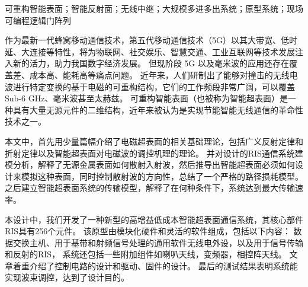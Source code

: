 \documentclass[supercite]{HustGraduPaper}
\begin{document}
\begin{cnabstract}{可重构智能表面；智能反射面；无线中继；大规模多进多出系统；原型系统；现场可编程逻辑门阵列}

	作为最新一代蜂窝移动通信技术，第五代移动通信技术（5G）以其大带宽、低时延、大连接等特性，将为物联网、社交娱乐、智慧交通、工业互联网等技术发展注入新的活力，助力我国数字经济发展。
	但现阶段 5G 以及毫米波的应用还存在覆盖差、成本高、能耗高等痛点问题。
	近年来，人们研制出了能够对撞击的无线电波进行特定变换的基于电磁的可重构结构，它们的工作频段非常广阔，可以覆盖 Sub-­6 GHz、毫米波甚至太赫兹。
	可重构智能表面（也被称为智能超表面）是一种具有大量无源元件的二维结构，近年来被认为是实现节能智能无线通信的革命性技术之一。

	本文中，首先用少量篇幅介绍了电磁超表面的相关基础理论，包括广义反射定律和折射定律以及智能超表面对电磁波的调控机理的理论。
	并对设计的RIS通信系统建模分析，解释了无源金属表面如何散射入射波，然后推导出智能超表面必须如何设计来模拟这种表面，同时控制散射波的方向性，总结了一个严格的路径损耗模型。
	之后建立智能超表面系统的传输模型，解释了在何种条件下，系统达到最大传输速率。
	
	本设计中，我们开发了一种新型的高增益低成本智能超表面通信系统，其核心部件RIS具有256个元件。
	该原型由模块化硬件和灵活的软件组成，包括以下内容：
	数据交换主机、用于基带和射频信号处理的通用软件无线电外设，以及用于信号传输和反射的RIS，
	系统还包括一些附加组件如喇叭天线，变频器，相控阵天线。
	文章着重介绍了控制电路的设计和驱动、固件的设计。
	最后的测试结果表明系统能实现波束调控，达到了设计目的。

\end{cnabstract}
\end{document}
